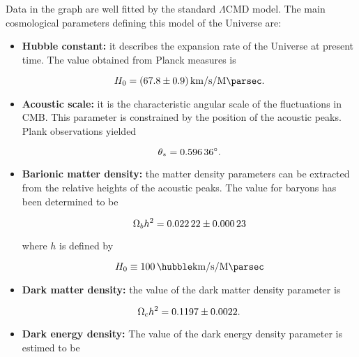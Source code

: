 Data in the graph are well fitted by the standard
$\Lambda$CMD model. The main cosmological parameters defining this model of
the Universe are:

\begin{itemize}
        \item \textbf{Hubble constant:} it describes the expansion rate of
        the Universe at present time. The value obtained from Planck
        measures is

        \begin{equation}
                H_0 = \SI{67.8 \pm 0.9}{\kilo\meter\per\second\per\mega\parsec}.
        \end{equation}

        \item \textbf{Acoustic scale:} it is the characteristic angular
        scale of the fluctuations in CMB. This parameter is constrained by
        the position of the acoustic peaks. Plank observations yielded

        \begin{equation}
                \theta_* = \ang{0.59636 \pm 0.00025}.
        \end{equation}

        \item \textbf{Barionic matter density:} the matter density
        parameters can be extracted from the relative heights of the
        acoustic peaks. The value for baryons has been determined to be

        \begin{equation}
                \Omega_b h^2 = \num{0.02222 \pm 0.00023}
        \end{equation}

        where $h$ is defined by

        \begin{equation}
                H_0 \equiv \SI{100}{\hubble\kilo\meter\per\second\per\mega\parsec}
        \end{equation}

        \item \textbf{Dark matter density:} the value of the dark matter
        density parameter is

        \begin{equation}
                \Omega_c h^2 = \num{0.1197 \pm 0.0022}.
        \end{equation}

        \item \textbf{Dark energy density:} The value of the dark energy
        density parameter is estimed to be


\end{itemize}
